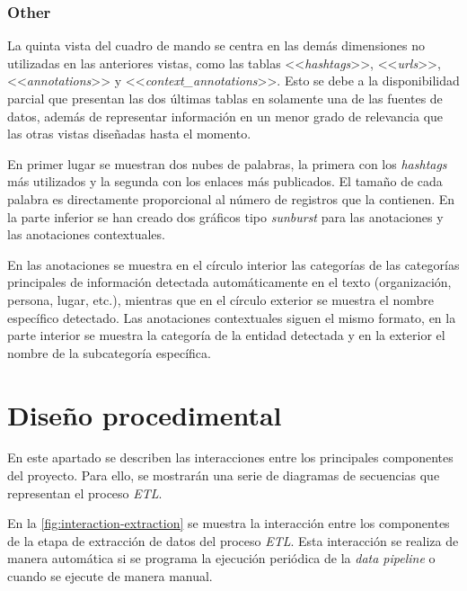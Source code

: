 

\subsubsection{Other}

La quinta vista del cuadro de mando se centra en las demás dimensiones no utilizadas en las anteriores vistas, como las tablas <<\textit{hashtags}>>, <<\textit{urls}>>, <<\textit{annotations}>> y <<\textit{context\_annotations}>>. Esto se debe a la disponibilidad parcial que presentan las dos últimas tablas en solamente una de las fuentes de datos, además de representar información en un menor grado de relevancia que las otras vistas diseñadas hasta el momento.

En primer lugar se muestran dos nubes de palabras, la primera con los \textit{hashtags} más utilizados y la segunda con los enlaces más publicados. El tamaño de cada palabra es directamente proporcional al número de registros que la contienen. En la parte inferior se han creado dos gráficos tipo \textit{sunburst} para las anotaciones y las anotaciones contextuales.

En las anotaciones se muestra en el círculo interior las categorías de las categorías principales de información detectada automáticamente en el texto (organización, persona, lugar, etc.), mientras que en el círculo exterior se muestra el nombre específico detectado. Las anotaciones contextuales siguen el mismo formato, en la parte interior se muestra la categoría de la entidad detectada y en la exterior el nombre de la subcategoría específica.





\section{Diseño procedimental}

En este apartado se describen las interacciones entre los principales componentes del proyecto. Para ello, se mostrarán una serie de diagramas de secuencias que representan el proceso \textit{ETL}.

En la \autoref{fig:interaction-extraction} se muestra la interacción entre los componentes de la etapa de extracción de datos del proceso \textit{ETL}. Esta interacción se realiza de manera automática si se programa la ejecución periódica de la \textit{data pipeline} o cuando se ejecute de manera manual.

